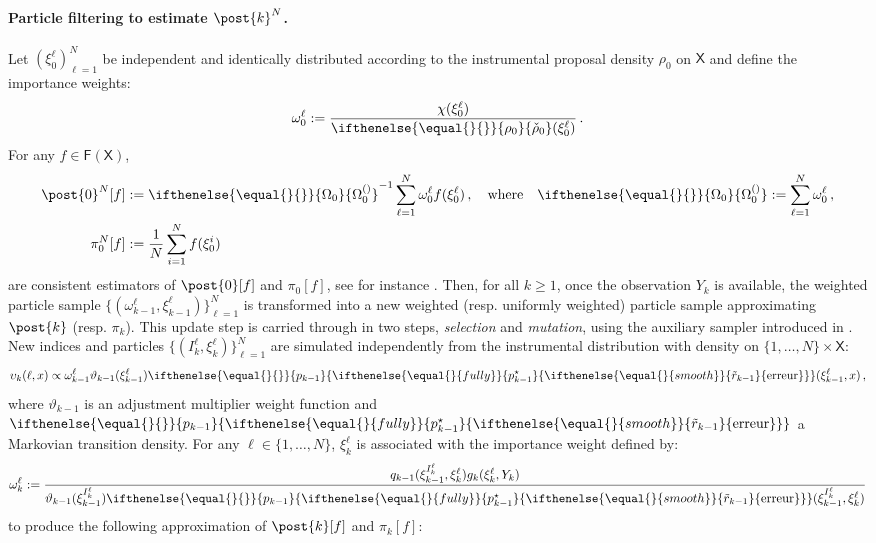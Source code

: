 \documentclass[nolayout]{article}
\newcommand{\eqsp}{\,}
\def\Xset{\mathsf{X}}
\newcommand{\md}[1]{g_{#1}}
\newcommand{\pred}[1]{\pi_{#1}}
\newcommand{\bmf}[1]{\set{F}(#1)}
\newcommand{\set}[1]{\mathsf{#1}}
\newcommand{\hd}[1]{q_{#1}}
\newcommand{\N}{N}
\newcommand{\partpred}[1]{\pi_{#1}^\N}
\newcommand{\kissforward}[3][]
{\ifthenelse{\equal{#1}{}}{p_{#2}}
{\ifthenelse{\equal{#1}{fully}}{p^{\star}_{#2}}
{\ifthenelse{\equal{#1}{smooth}}{\tilde{r}_{#2}}{\mathrm{erreur}}}}}
\newcommand{\instrpostaux}[1]{\ensuremath{\upsilon_{#1}}}
\newcommand{\XinitIS}[2][]
{\ifthenelse{\equal{#1}{}}{\ensuremath{\rho_{#2}}}{\ensuremath{\check{\rho}_{#2}}}}
\newcommand{\adjfuncforward}[1]{\vartheta_{#1}}
\newcommand{\eqdef}{\ensuremath{:=}}
\newcommand{\ewght}[2]{\ensuremath{\omega_{#1}^{#2}}}
\newcommand{\epart}[2]{\ensuremath{\xi_{#1}^{#2}}}
\newcommand{\Xinit}{\ensuremath{\chi}}
\newcommand{\sumwght}[2][]{%
\ifthenelse{\equal{#1}{}}{\ensuremath{\Omega_{#2}}}{\ensuremath{\Omega_{#2}^{(#1)}}}}
\begin{document}
\paragraph{Particle filtering to estimate $\post{k}^\N$.} Let $(\epart{0}{\ell})_{\ell = 1}^\N$ be independent and identically distributed according to the instrumental proposal density $\rho_0$ on $\Xset$ and define the importance weights:
\[
\ewght{0}{\ell} \eqdef \frac{\Xinit(\epart{0}{\ell})}{\XinitIS{0}(\epart{0}{\ell})}\eqsp.
\]
For any  $f\in \bmf{\Xset}$,
\begin{align*}
\post{0}^\N[f]&\eqdef \sumwght{0}^{-1}\sum_{\ell=1}^\N \ewght{0}{\ell}f(\epart{0}{\ell})\eqsp,\quad\mbox{where}\quad\sumwght{0}\eqdef \sum_{\ell=1}^N \ewght{0}{\ell}\eqsp,\\
\partpred{0}[f] &\eqdef \frac{1}{\N} \sum_{i=1}^{\N} f(\epart{0}{i})
\end{align*}
are consistent estimators of $\post{0}[f]$ and $\pred{0} [f]$, see for instance \cite{delmoral:2004}. Then, for all $k\geqslant 1$, once the observation $Y_k$ is available, the weighted particle sample $\{(\ewght{k-1}{\ell},\epart{k-1}{\ell})\}_{\ell=1}^{\N}$ is transformed into a new weighted (resp. uniformly weighted) particle sample approximating $\post{k}$ (resp. $\pred{k}$). This update step is carried through in two steps, \emph{selection} and \emph{mutation},  using the auxiliary sampler introduced in \cite{pitt:shephard:1999}. New indices and particles $\{ (I_k^{\ell}, \epart{k}{\ell}) \}_{\ell = 1}^\N$ are simulated independently from the instrumental distribution with density on $\{1, \dots, \N\} \times \Xset$:
\begin{equation} 
\label{eq:instrumental-distribution-filtering}
\instrpostaux{k}(\ell,x) \propto \ewght{k-1}{\ell} \adjfuncforward{k-1}(\epart{k-1}{\ell}) \kissforward{k-1}{k-1}(\epart{k-1}{\ell},x) \eqsp,
\end{equation}
where $\adjfuncforward{k-1}$ is an adjustment multiplier weight function and $\kissforward{k-1}{k-1}$ a Markovian transition density. For any  $\ell \in\{1, \dots, \N\}$, $\epart{k}{\ell}$ is associated with the  importance weight defined by:
\begin{equation}
\label{eq:weight-update-filtering}
    \ewght{k}{\ell} \eqdef \frac{\hd{k-1}(\epart{k-1}{I_k^{\ell}},\epart{k}{\ell})\md{k}(\epart{k}{\ell},Y_{k})}{\adjfuncforward{k-1}(\epart{k-1}{I_k^{\ell}}) \kissforward{k-1}{k-1}(\epart{k-1}{I_k^{\ell}},\epart{k}{\ell})}
\end{equation}
to produce the following approximation of $\post{k}[f]$ and $\pred{k}[f]$:
\end{document}
